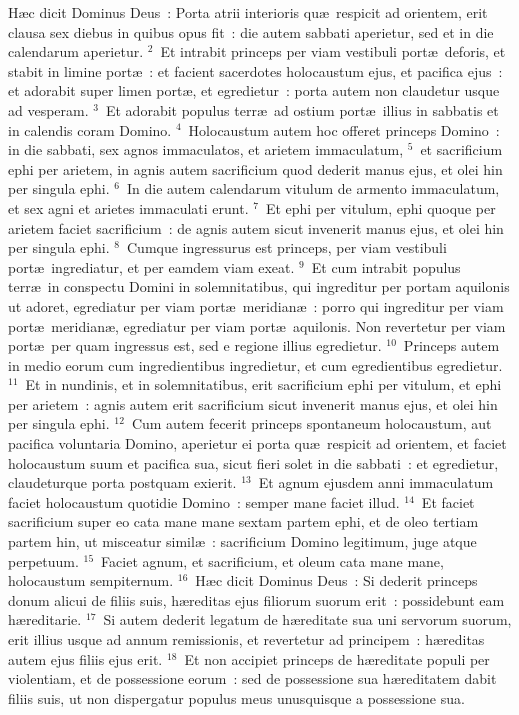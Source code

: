 \bchapter
\lettrine[lines=3,image=true,loversize=0.05,lraise=-0.03]{H}{}\ae c dicit Dominus Deus~: Porta atrii interioris qu\ae\ respicit ad orientem, erit clausa sex diebus in quibus opus fit~: die autem sabbati aperietur, sed et in die calendarum aperietur.
${}^{2}$~Et intrabit princeps per viam vestibuli port\ae\ deforis, et stabit in limine port\ae~: et facient sacerdotes holocaustum ejus, et pacifica ejus~: et adorabit super limen port\ae , et egredietur~: porta autem non claudetur usque ad vesperam.
${}^{3}$~Et adorabit populus terr\ae\ ad ostium port\ae\ illius in sabbatis et in calendis coram Domino.
${}^{4}$~Holocaustum autem hoc offeret princeps Domino~: in die sabbati, sex agnos immaculatos, et arietem immaculatum,
${}^{5}$~et sacrificium ephi per arietem, in agnis autem sacrificium quod dederit manus ejus, et olei hin per singula ephi.
${}^{6}$~In die autem calendarum vitulum de armento immaculatum, et sex agni et arietes immaculati erunt.
${}^{7}$~Et ephi per vitulum, ephi quoque per arietem faciet sacrificium~: de agnis autem sicut invenerit manus ejus, et olei hin per singula ephi.
${}^{8}$~Cumque ingressurus est princeps, per viam vestibuli port\ae\ ingrediatur, et per eamdem viam exeat.
${}^{9}$~Et cum intrabit populus terr\ae\ in conspectu Domini in solemnitatibus, qui ingreditur per portam aquilonis ut adoret, egrediatur per viam port\ae\ meridian\ae~: porro qui ingreditur per viam port\ae\ meridian\ae , egrediatur per viam port\ae\ aquilonis. Non revertetur per viam port\ae\ per quam ingressus est, sed e regione illius egredietur.
${}^{10}$~Princeps autem in medio eorum cum ingredientibus ingredietur, et cum egredientibus egredietur.
${}^{11}$~Et in nundinis, et in solemnitatibus, erit sacrificium ephi per vitulum, et ephi per arietem~: agnis autem erit sacrificium sicut invenerit manus ejus, et olei hin per singula ephi.
${}^{12}$~Cum autem fecerit princeps spontaneum holocaustum, aut pacifica voluntaria Domino, aperietur ei porta qu\ae\ respicit ad orientem, et faciet holocaustum suum et pacifica sua, sicut fieri solet in die sabbati~: et egredietur, claudeturque porta postquam exierit.
${}^{13}$~Et agnum ejusdem anni immaculatum faciet holocaustum quotidie Domino~: semper mane faciet illud.
${}^{14}$~Et faciet sacrificium super eo cata mane mane sextam partem ephi, et de oleo tertiam partem hin, ut misceatur simil\ae~: sacrificium Domino legitimum, juge atque perpetuum.
${}^{15}$~Faciet agnum, et sacrificium, et oleum cata mane mane, holocaustum sempiternum.
${}^{16}$~H\ae c dicit Dominus Deus~: Si dederit princeps donum alicui de filiis suis, h\ae reditas ejus filiorum suorum erit~: possidebunt eam h\ae reditarie.
${}^{17}$~Si autem dederit legatum de h\ae reditate sua uni servorum suorum, erit illius usque ad annum remissionis, et revertetur ad principem~: h\ae reditas autem ejus filiis ejus erit.
${}^{18}$~Et non accipiet princeps de h\ae reditate populi per violentiam, et de possessione eorum~: sed de possessione sua h\ae reditatem dabit filiis suis, ut non dispergatur populus meus unusquisque a possessione sua.


